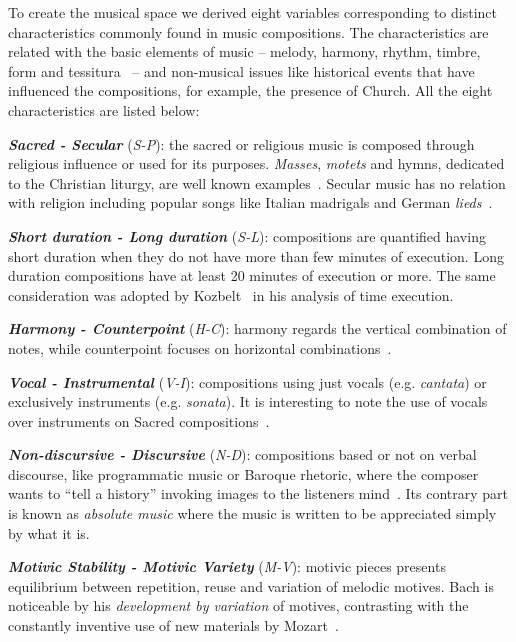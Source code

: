 \documentclass[
 aip,
 jmp,
 amsmath,amssymb,
 reprint,
]{revtex4-1}
\begin{document}
To create the musical space we derived eight variables corresponding to
distinct characteristics commonly found in music compositions. The
characteristics are related with the basic elements of music -- melody,
harmony, rhythm, timbre, form and tessitura~\cite{BennettHistory} -- and
non-musical issues like historical events that have influenced the
compositions, for example, the
presence of Church. All the eight
characteristics are listed below:

{\bf \em{ Sacred - Secular}} (\emph{S-P}): the sacred or religious music is
composed through religious influence or used for its purposes. \textit{Masses},
\textit{motets} and hymns, dedicated to the Christian liturgy, are well known examples~\cite{Lovelock}. Secular
music has no relation with religion including
popular songs like Italian madrigals and German \textit{lieds}~\cite{BennettHistory}. 

{\bf \em{ Short duration - Long duration}} (\emph{S-L}): compositions are
quantified having short duration when they do not have more than few minutes
of execution. Long duration compositions have at least 20 minutes of execution or
more. The same consideration was adopted by Kozbelt~\cite{Kozbelt01012009,
  Kozbelt01012007} in his analysis of time execution.

{\bf \em{ Harmony - Counterpoint}} (\emph{H-C}): harmony regards the
vertical combination of notes, while counterpoint focuses on
horizontal combinations~\cite{BennettHistory}.

{\bf \em{ Vocal - Instrumental}} (\emph{V-I}): compositions using just vocals
(e.g. \emph{cantata}) or exclusively instruments
(e.g. \emph{sonata}). It is interesting to note the use of
vocals over instruments on Sacred compositions~\cite{Lovelock}.

{\bf \em{ Non-discursive - Discursive}} (\emph{N-D}): compositions
based or not
on verbal discourse, like programmatic music or Baroque rhetoric, where the composer wants
to ``tell a history'' invoking images to the listeners
mind~\cite{BennettHistory}. Its contrary part is known as
\textit{absolute music} where the music is written to be appreciated simply
by what it is.

{\bf \em{ Motivic Stability - Motivic Variety}} (\emph{M-V}): motivic pieces presents equilibrium
between repetition, reuse and variation of melodic motives. Bach is noticeable by his
\textit{development by variation} of motives, contrasting with the
constantly inventive use of new materials by Mozart~\cite{Webern}.
\end{document}

